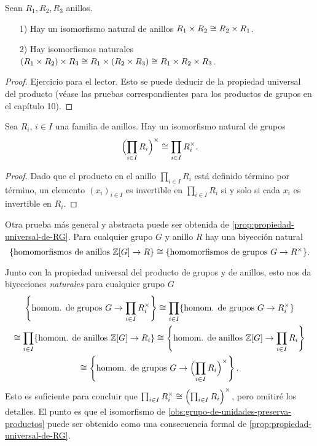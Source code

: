 \begin{observacion}
  Sean $R_1, R_2, R_3$ anillos.

  \begin{enumerate}
  \item[1)] Hay un isomorfismo natural de anillos
    $R_1\times R_2 \cong R_2 \times R_1$.

  \item[2)] Hay isomorfismos naturales
    $(R_1\times R_2)\times R_3 \cong R_1 \times (R_2\times R_3) \cong R_1 \times R_2 \times R_3$.
  \end{enumerate}

  \begin{proof}
    Ejercicio para el lector. Esto se puede deducir de la propiedad universal
    del producto (véase las pruebas correspondientes para los productos
    de grupos en el capítulo 10).
  \end{proof}
\end{observacion}

\begin{observacion}
  \label{obs:grupo-de-unidades-preserva-productos}
  Sea $R_i$, $i\in I$ una familia de anillos. Hay un isomorfismo natural
  de grupos
  $$\Bigl(\prod_{i\in I} R_i\Bigr)^\times \cong \prod_{i\in I} R_i^\times.$$

  \begin{proof}
    Dado que el producto en el anillo $\prod_{i\in I} R_i$ está definido término
    por término, un elemento $(x_i)_{i\in I}$ es invertible
    en $\prod_{i\in I} R_i$ si y solo si cada $x_i$ es invertible en $R_i$.
  \end{proof}
\end{observacion}

\begin{digresion}[*]
  Otra prueba más general y abstracta puede ser obtenida de
  \ref{prop:propiedad-universal-de-RG}. Para cualquier grupo $G$ y anillo $R$
  hay una biyección natural
  \[ \{ \text{homomorfismos de anillos }\mathbb{Z} [G]\to R \} \cong
     \{ \text{homomorfismos de grupos }G\to R^\times \}. \]

  Junto con la propiedad universal del producto de grupos y de anillos, esto nos
  da biyecciones \emph{naturales} para cualquier grupo $G$
  \begin{multline*}
    \left\{ \text{homom. de grupos }G\to \prod_{i\in I} R_i^\times \right\} \cong
    \prod_{i\in I} \{ \text{homom. de grupos }G\to R_i^\times \} \\
    \cong \prod_{i\in I} \{ \text{homom. de anillos }\mathbb{Z} [G]\to R_i \} \cong
    \left\{ \text{homom. de anillos }\mathbb{Z} [G]\to \prod_{i\in I} R_i \right\} \\
    \cong \left\{ \text{homom. de grupos }G\to \Bigl(\prod_{i\in I} R_i\Bigr)^\times \right\}.
  \end{multline*}
  Esto es suficiente para concluir que
  $\prod_{i\in I} R_i^\times \cong \Bigl(\prod_{i\in I} R_i\Bigr)^\times$, pero
  omitiré los detalles. El punto es que el isomorfismo
  de \ref{obs:grupo-de-unidades-preserva-productos} puede ser obtenido como
  una consecuencia formal de \ref{prop:propiedad-universal-de-RG}.
\end{digresion}

